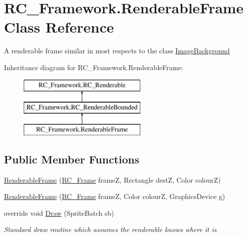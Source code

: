 \hypertarget{class_r_c___framework_1_1_renderable_frame}{}\section{R\+C\+\_\+\+Framework.\+Renderable\+Frame Class Reference}
\label{class_r_c___framework_1_1_renderable_frame}


A renderable frame similar in most respects to the class \mbox{\hyperlink{class_r_c___framework_1_1_image_background}{Image\+Background}}  


Inheritance diagram for R\+C\+\_\+\+Framework.\+Renderable\+Frame\+:\begin{figure}[H]
\begin{center}
\leavevmode
\includegraphics[height=3.000000cm]{class_r_c___framework_1_1_renderable_frame}
\end{center}
\end{figure}
\subsection*{Public Member Functions}
\begin{DoxyCompactItemize}
\item 
\mbox{\hyperlink{class_r_c___framework_1_1_renderable_frame_ac9e833096374af28d045ca825c8032f6}{Renderable\+Frame}} (\mbox{\hyperlink{class_r_c___framework_1_1_r_c___frame}{R\+C\+\_\+\+Frame}} frameZ, Rectangle destZ, Color colourZ)
\item 
\mbox{\hyperlink{class_r_c___framework_1_1_renderable_frame_abfdd49e56c1ac7f8e44c6977fe0cdcbe}{Renderable\+Frame}} (\mbox{\hyperlink{class_r_c___framework_1_1_r_c___frame}{R\+C\+\_\+\+Frame}} frameZ, Color colourZ, Graphics\+Device g)
\item 
override void \mbox{\hyperlink{class_r_c___framework_1_1_renderable_frame_af07cf299871051c7e1c6ca455ba1bab9}{Draw}} (Sprite\+Batch sb)
\begin{DoxyCompactList}\small\item\em Standard draw routine which assumes the renderable knows where it is \end{DoxyCompactList}\end{DoxyCompactItemize}
